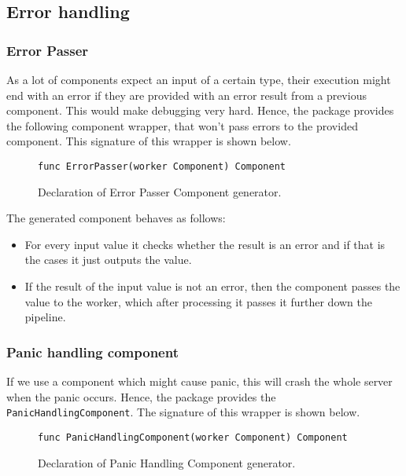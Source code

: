 \documentclass[12pt,a4paper]{article}
\begin{document}
\subsection{Error handling}
\subsubsection{Error Passer}
As a lot of components expect an input of a certain type, their execution
might end with an error if they are provided with an error result from
a previous component. This would make debugging very hard. Hence, the 
package provides the following component wrapper, that won't pass errors
to the provided component. This signature of this wrapper is shown below.
\begin{figure}[h]
\centering
\begin{lstlisting}
func ErrorPasser(worker Component) Component
\end{lstlisting}
\caption[scale=1.0]{Declaration of Error Passer Component generator.}
\label{fig:ErrorPasser}
\end{figure}

The generated component behaves as follows:
\begin{itemize}
	\item For every input value it checks whether the result is an error
		  and if that is the cases it just outputs the value.
	\item If the result of the input value is not an error, then the component
		  passes the value to the worker, which after processing it passes 
		  it further down the pipeline.
\end{itemize}

\subsubsection{Panic handling component}
If we use a component which might cause panic, this will crash the whole
server when the panic occurs. Hence, the package provides the 
\texttt{PanicHandlingComponent}. The signature of this wrapper is shown 
below.
\begin{figure}[h]
\centering
\begin{lstlisting}
func PanicHandlingComponent(worker Component) Component
\end{lstlisting}
\caption[scale=1.0]{Declaration of Panic Handling Component generator.}
\label{fig:panicHandler}
\end{figure}
\end{document}
